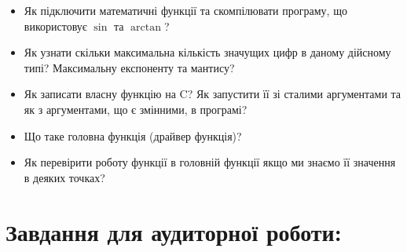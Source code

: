 \documentclass[a5paper,titlepage,openany,twoside,draft]{book_unv}%
\begin{document}
\begin{itemize}
\item
Як підключити математичні функції та скомпілювати програму, що
використовує $\sin$ та $\arctan$?

\item
Як узнати скільки максимальна кількість значущих цифр в даному
дійсному типі? Максимальну експоненту та мантису?

\item
Як записати власну функцію на C? Як запустити її зі сталими
аргументами та як з аргументами, що є змінними, в програмі?

\item
Що таке головна функція (драйвер функція)?

\item
Як перевірити роботу функції в головній функції якщо ми знаємо
її значення в деяких точках?

\end{itemize}

\section{Завдання для аудиторної роботи:}
\end{document}
